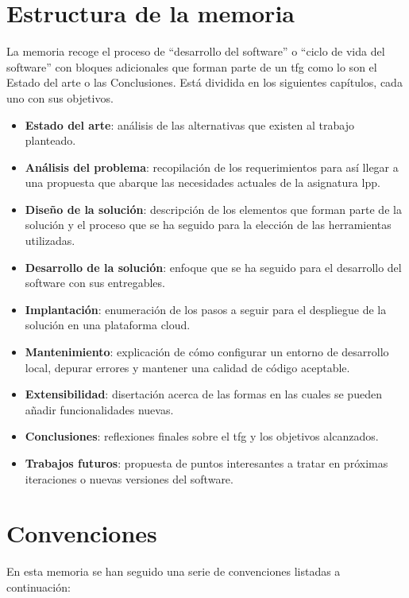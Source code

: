 \documentclass[11pt,spanish,listoffigures,listoftables]{tfgetsinf}
\begin{document}
\section{Estructura de la memoria}

La memoria recoge el proceso de ``desarrollo del software'' o ``ciclo de vida del software'' con bloques adicionales que forman parte de un \acrshort{tfg} como lo son el Estado del arte o las Conclusiones. Está dividida en los siguientes capítulos, cada uno con sus objetivos.

\begin{itemize}
	\item \textbf{Estado del arte}: análisis de las alternativas que existen al trabajo planteado. 
	\item \textbf{Análisis del problema}: recopilación de los requerimientos para así llegar a una propuesta que abarque las necesidades actuales de la asignatura \acrshort{lpp}.
	\item \textbf{Diseño de la solución}: descripción de los elementos que forman parte de la solución y el proceso que se ha seguido para la elección de las herramientas utilizadas.
	\item \textbf{Desarrollo de la solución}: enfoque que se ha seguido para el desarrollo del software con sus entregables.
	\item \textbf{Implantación}: enumeración de los pasos a seguir para el despliegue de la solución en una plataforma \foreignlanguage{english}{cloud}.
	\item \textbf{Mantenimiento}: explicación de cómo configurar un entorno de desarrollo local, depurar errores y mantener una calidad de código aceptable. 
	\item \textbf{Extensibilidad}: disertación acerca de las formas en las cuales se pueden añadir funcionalidades nuevas.
	\item \textbf{Conclusiones}: reflexiones finales sobre el \acrshort{tfg} y los objetivos alcanzados.
	\item \textbf{Trabajos futuros}: propuesta de puntos interesantes a tratar en próximas iteraciones o nuevas versiones del software.
\end{itemize}

\section{Convenciones}

En esta memoria se han seguido una serie de convenciones listadas a continuación:
\end{document}
